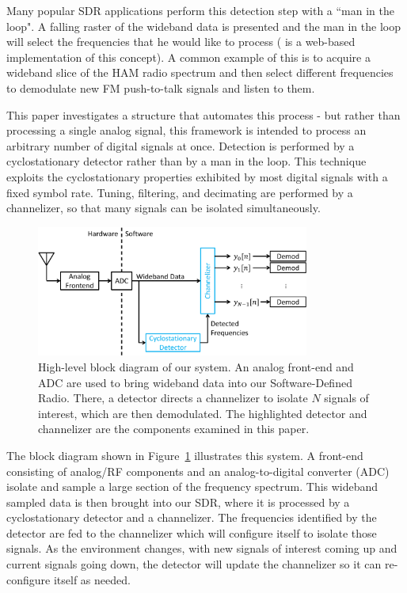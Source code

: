 \documentclass[12pt]{article}
\begin{document}
Many popular SDR applications perform this detection step with a ``man in the
loop".  A falling raster of the wideband data is presented and the man in the
loop will select  the frequencies that he would like to process (\cite{WebSDR}
is a web-based implementation of this concept).  A common example of this is to
acquire a wideband slice of the HAM radio spectrum and then select different
frequencies to demodulate new FM push-to-talk signals and listen to them.

This paper investigates a structure that automates this process - but rather
than processing a single analog signal, this framework is intended to process
an arbitrary number of digital signals at once. Detection is performed by
a cyclostationary detector rather than by a man in the loop. This technique
exploits the cyclostationary properties exhibited by most digital signals with
a fixed symbol rate.  Tuning, filtering, and decimating are performed by
a channelizer, so that many signals can be isolated simultaneously.  

\begin{figure}[h!]
    \begin{center}
    \includegraphics[width=0.8\textwidth]{block_diagram}%
    \end{center}
    \caption{High-level block diagram of our system. An analog front-end and
        ADC are used to bring wideband data into our Software-Defined Radio.
        There, a detector directs a channelizer to isolate $N$ signals of
        interest, which are then demodulated. The highlighted detector and
        channelizer are the components examined in this paper.}
    \label{fig:block_diagram}
\end{figure}

The block diagram shown in Figure~\ref{fig:block_diagram} illustrates this
system. A front-end consisting of analog/RF components and an analog-to-digital
converter (ADC) isolate and sample a large section of the frequency spectrum.
This wideband sampled data is then brought into our SDR, where it is processed
by a cyclostationary detector and a channelizer. The frequencies identified by
the detector are fed to the channelizer which will configure itself to isolate
those signals. As the environment changes, with new signals of interest coming
up and current signals going down, the detector will update the channelizer so
it can re-configure itself as needed.
\end{document}

